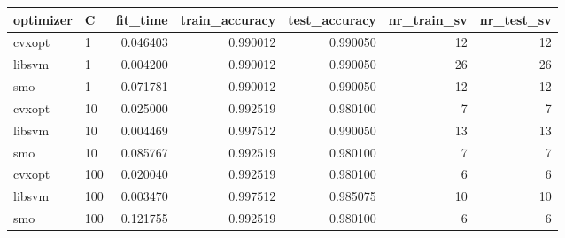 \begin{tabular}{llrrrrr}
\toprule
optimizer &   C &  fit\_time &  train\_accuracy &  test\_accuracy &  nr\_train\_sv &  nr\_test\_sv \\
\midrule
   cvxopt &   1 &  0.046403 &        0.990012 &       0.990050 &           12 &          12 \\
   libsvm &   1 &  0.004200 &        0.990012 &       0.990050 &           26 &          26 \\
      smo &   1 &  0.071781 &        0.990012 &       0.990050 &           12 &          12 \\
   cvxopt &  10 &  0.025000 &        0.992519 &       0.980100 &            7 &           7 \\
   libsvm &  10 &  0.004469 &        0.997512 &       0.990050 &           13 &          13 \\
      smo &  10 &  0.085767 &        0.992519 &       0.980100 &            7 &           7 \\
   cvxopt & 100 &  0.020040 &        0.992519 &       0.980100 &            6 &           6 \\
   libsvm & 100 &  0.003470 &        0.997512 &       0.985075 &           10 &          10 \\
      smo & 100 &  0.121755 &        0.992519 &       0.980100 &            6 &           6 \\
\bottomrule
\end{tabular}
